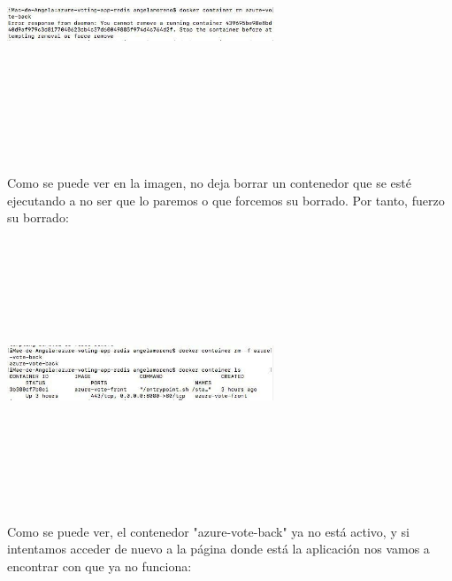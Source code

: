\documentclass[english,runningheads,a4paper]{llncs}[2018/03/10]
\newenvironment{nscenter}
 {\parskip=0pt\par\nopagebreak\centering}
 {\par\noindent\ignorespacesafterend}
\begin{document}
\begin{nscenter}
\includegraphics[width=8cm,height=8cm,keepaspectratio]{./Contenedores/Azure/15.jpg}
\end{nscenter}
\newline
Como se puede ver en la imagen, no deja borrar un contenedor que se esté 
ejecutando a no ser que lo paremos o que forcemos su borrado. Por tanto, fuerzo 
su borrado:
\newline
\begin{nscenter}
\includegraphics[width=8cm,height=8cm,keepaspectratio]{./Contenedores/Azure/16.jpg}
\end{nscenter}
\newline
Como se puede ver, el contenedor "azure-vote-back" ya no está activo, y si 
intentamos acceder de nuevo a la página donde está la aplicación nos vamos a 
encontrar con que ya no funciona:
\newline
\end{document}
